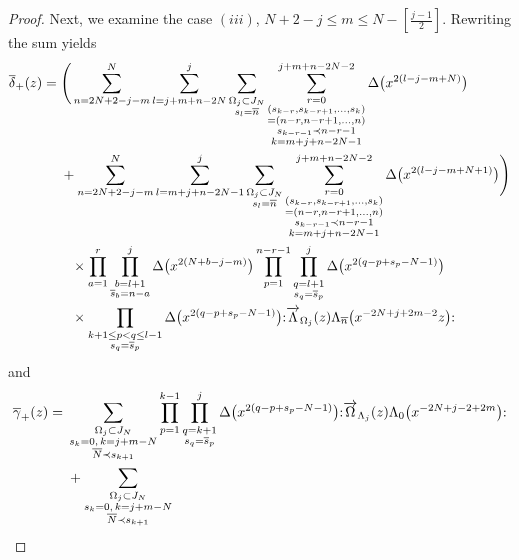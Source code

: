 \documentclass[pdftex]{sigma}
\numberwithin{equation}{section}
\begin{document}
\begin{proof}
Next, we examine the case $(iii)$, $N+2-j \leq m \leq N-[\frac{j-1}{2}]$.
Rewriting the sum yields
\begin{align}
\overline{\delta}_+(z)={}&
\Bigg(\sum_{n=2N+2-j-m}^{N}\sum_{l=j+m+n-2N}^{j}
\sum\limits_{\substack{\Omega_j \subset J_N\\s_l=\overline{n}}}
\sum\limits_{\substack{r=0\\(s_{k-r}, s_{k-r+1},\dots,s_{k})\\=
(n-r, n-r+1,\dots, n)\\s_{k-r-1} \prec n-r-1\\ k=m+j+n-2N-1}}^{j+m+n-2N-2}
\Delta\big(x^{2(l-j-m+N)}\big)\notag
\\
&+\sum_{n=2N+2-j-m}^{N}\sum_{l=m+j+n-2N-1}^j
\sum\limits_{\substack{\Omega_j \subset J_N \\s_l=\overline{n}}}
\sum\limits_{\substack{r=0\\(s_{k-r}, s_{k-r+1},\dots,s_{k})\\=(n-r, n-r+1,\dots, n)
\\s_{k-r-1} \prec n-r-1\\ k=m+j+n-2N-1}}^{j+m+n-2N-2}
\Delta\big(x^{2(l-j-m+N+1)}\big)\Bigg)\notag
\\
&\phantom{+}\times\prod_{a=1}^r \prod\limits_{\substack{b=l+1\\\overline{s}_b=n-a}}^j
\Delta\big(x^{2(N+b-j-m)}\big)\prod_{p=1}^{n-r-1}
\prod\limits_{\substack{q=l+1\\ s_q=\overline{s}_p}}^j
\Delta\big(x^{2(q-p+s_p-N-1)}\big)\notag
\\
&\phantom{+}\times\prod\limits_{\substack{k+1 \leq p<q \leq l-1\\s_q=\overline{s}_p}}
\Delta\big(x^{2(q-p+s_p-N-1)}\big)
{:}\overrightarrow{\Lambda}_{\Omega_j}(z)\Lambda_{\overline{n}}\big(x^{-2N+j+2m-2}z\big){:}
\label{eqn:bdelta+}
\end{align}
and
\begin{align}
\overline{\gamma}_+(z)={}&\sum\limits_{\substack{\Omega_j \subset J_N
\\s_k=0,\, k=j+m-N\\ \overline{N}\prec s_{k+1}}}
\prod_{p=1}^{k-1}\prod\limits_{\substack{q=k+1\\ s_q=\overline{s}_p}}^j
\Delta\big(x^{2(q-p+s_p-N-1)}\big)
{:}\overrightarrow{\Omega}_{\Lambda_j}(z)\Lambda_0\big(x^{-2N+j-2+2m}\big){:}\notag
\\
&+\sum\limits_{\substack{\Omega_j \subset J_N\\s_k=0,\, k=j+m-N
\\ \overline{N}\prec s_{k+1}}}

\end{align}
\end{proof}
\end{document}
